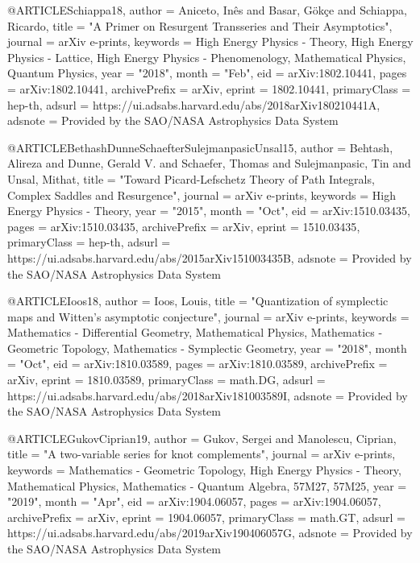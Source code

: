 @ARTICLE{Schiappa18,
       author = {{Aniceto}, In{\^e}s and {Ba{\textcommabelow s}ar}, G{\"o}k{\c{c}}e and
         {Schiappa}, Ricardo},
        title = "{A Primer on Resurgent Transseries and Their Asymptotics}",
      journal = {arXiv e-prints},
     keywords = {High Energy Physics - Theory, High Energy Physics - Lattice, High Energy Physics - Phenomenology, Mathematical Physics, Quantum Physics},
         year = "2018",
        month = "Feb",
          eid = {arXiv:1802.10441},
        pages = {arXiv:1802.10441},
archivePrefix = {arXiv},
       eprint = {1802.10441},
 primaryClass = {hep-th},
       adsurl = {https://ui.adsabs.harvard.edu/abs/2018arXiv180210441A},
      adsnote = {Provided by the SAO/NASA Astrophysics Data System}
}

@ARTICLE{BethashDunneSchaefterSulejmanpasicUnsal15,
       author = {{Behtash}, Alireza and {Dunne}, Gerald V. and {Schaefer}, Thomas and
         {Sulejmanpasic}, Tin and {Unsal}, Mithat},
        title = "{Toward Picard-Lefschetz Theory of Path Integrals, Complex Saddles and Resurgence}",
      journal = {arXiv e-prints},
     keywords = {High Energy Physics - Theory},
         year = "2015",
        month = "Oct",
          eid = {arXiv:1510.03435},
        pages = {arXiv:1510.03435},
archivePrefix = {arXiv},
       eprint = {1510.03435},
 primaryClass = {hep-th},
       adsurl = {https://ui.adsabs.harvard.edu/abs/2015arXiv151003435B},
      adsnote = {Provided by the SAO/NASA Astrophysics Data System}
}

@ARTICLE{Ioos18,
       author = {{Ioos}, Louis},
        title = "{Quantization of symplectic maps and Witten's asymptotic conjecture}",
      journal = {arXiv e-prints},
     keywords = {Mathematics - Differential Geometry, Mathematical Physics, Mathematics - Geometric Topology, Mathematics - Symplectic Geometry},
         year = "2018",
        month = "Oct",
          eid = {arXiv:1810.03589},
        pages = {arXiv:1810.03589},
archivePrefix = {arXiv},
       eprint = {1810.03589},
 primaryClass = {math.DG},
       adsurl = {https://ui.adsabs.harvard.edu/abs/2018arXiv181003589I},
      adsnote = {Provided by the SAO/NASA Astrophysics Data System}
}

@ARTICLE{GukovCiprian19,
       author = {{Gukov}, Sergei and {Manolescu}, Ciprian},
        title = "{A two-variable series for knot complements}",
      journal = {arXiv e-prints},
     keywords = {Mathematics - Geometric Topology, High Energy Physics - Theory, Mathematical Physics, Mathematics - Quantum Algebra, 57M27, 57M25},
         year = "2019",
        month = "Apr",
          eid = {arXiv:1904.06057},
        pages = {arXiv:1904.06057},
archivePrefix = {arXiv},
       eprint = {1904.06057},
 primaryClass = {math.GT},
       adsurl = {https://ui.adsabs.harvard.edu/abs/2019arXiv190406057G},
      adsnote = {Provided by the SAO/NASA Astrophysics Data System}
}

